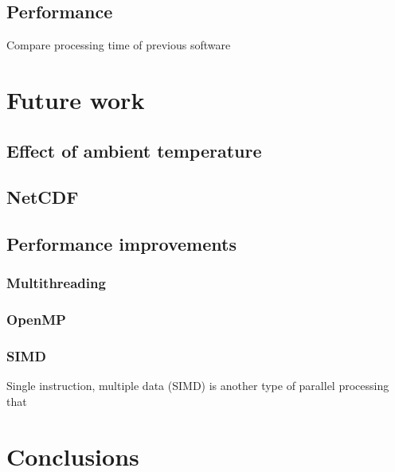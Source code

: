 \documentclass{article}
\begin{document}
\subsection{Performance}
Compare processing time of previous software

\section{Future work}
\subsection{Effect of ambient temperature}
\subsection{NetCDF}

\subsection{Performance improvements}
\subsubsection{Multithreading}
\subsubsection{OpenMP}
\subsubsection{SIMD}
Single instruction, multiple data (SIMD) is another type of parallel processing that 

\section{Conclusions}

\clearpage
\printglossary
\printbibliography
\end{document}

